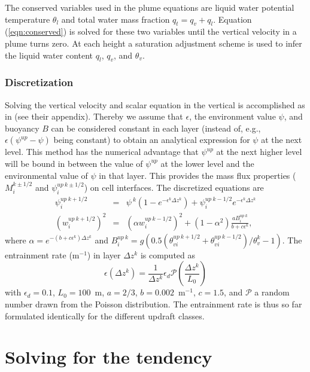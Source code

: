\documentclass[dvipdfmx,a4paper,10pt]{article}
\begin{document}
The conserved variables used in the plume equations are liquid water potential temperature $\theta_l$ and total water mass fraction $q_t=q_v+q_l$. Equation (\ref{eqn:conserved}) is solved for these two variables until the vertical velocity in a plume turns zero. At each height a saturation adjustment scheme is used to infer the liquid water content $q_l$, $q_v$, and $\theta_v$. 


\subsubsection{Discretization}
Solving the vertical velocity and scalar equation in the vertical is accomplished as in \cite{suselj14} (see their appendix). Thereby we assume that $\epsilon$, the environment value $\psi$, and buoyancy $B$ can be considered constant in each layer (instead of, e.g., $\epsilon(\psi^{up}-\psi)$ being constant) to obtain an analytical expression for $\psi$ at the next level. This method has the numerical advantage that $\psi^{up}$ at the next higher level will be bound in between the value of $\psi^{up}$ at the lower level and the environmental value of $\psi$ in that layer. This provides the mass flux properties ($M_i^{k\pm 1/2}$ and $\psi^{up~k\pm 1/2}_i$) on cell interfaces. The discretized equations are 
\begin{eqnarray}
 \psi_i^{up~k+1/2}&=&\psi^{~k}(1-e^{-\epsilon^{k}\Delta z^k})+\psi_i^{up~k-1/2}e^{-\epsilon^{k}\Delta z^k}\\
 (w_i^{up~k+1/2})^2&=&(\alpha w_i^{up~k-1/2})^2 + (1-\alpha^2) \frac{aB_i^{up~k}}{b+c\epsilon^k},
\end{eqnarray}
where $\alpha=e^{-(b+c\epsilon^k)\Delta z^k}$ and $B_i^{up~k}=g(0.5(\theta_{vi}^{up~k+1/2}+\theta_{vi}^{up~k-1/2})/\theta_v^{k}-1)$. The entrainment rate (m$^{-1}$) in layer $\Delta z^k$ is computed as
\begin{equation}
 \epsilon(\Delta z^k) = \frac{1}{\Delta z^k} \epsilon_d \mathcal{P}(\frac{\Delta z^k}{L_0})
\end{equation}
with $\epsilon_d=0.1$, $L_0=100$~m, $a=2/3$, $b=0.002$~m$^{-1}$, $c=1.5$, and $\mathcal{P}$ a random number drawn from the Poisson distribution. The entrainment rate is thus so far formulated identically for the different updraft classes. 

\section{Solving for the tendency}\label{sec:solve}
\end{document}
